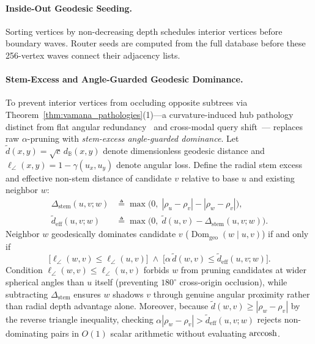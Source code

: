 \paragraph{Inside-Out Geodesic Seeding.}
Sorting vertices by non-decreasing depth schedules interior vertices before boundary waves. Router seeds are computed from the full database before these 256-vertex waves connect their adjacency lists.

\paragraph{Stem-Excess and Angle-Guarded Geodesic Dominance.}
To prevent interior vertices from occluding opposite subtrees via Theorem~\ref{thm:vamana_pathologies}(1)---a curvature-induced hub pathology distinct from flat angular redundancy~\cite{fu2019nsg,fu2022high} and cross-modal query shift~\cite{chen2024roargraph}---\rquiver{} replaces raw $\alpha$-pruning with \emph{stem-excess angle-guarded dominance}.
Let $\tilde{d}(x, y) = \sqrt{c}\,d_{\mathbb{B}}(x, y)$ denote dimensionless geodesic distance and $\ell_\angle(x, y) = 1 - \hat{\gamma}(u_x, u_y)$ denote angular loss.
Define the radial stem excess and effective non-stem distance of candidate $v$ relative to base $u$ and existing neighbor $w$:
\begin{align}
  \Delta_{\mathrm{stem}}(u, v; w) &\triangleq \max\!\bigl(0,\; |\rho_u - \rho_v| - |\rho_w - \rho_v|\bigr), \nonumber \\
  \tilde{d}_{\mathrm{eff}}(u, v; w) &\triangleq \max\!\bigl(0,\; \tilde{d}(u, v) - \Delta_{\mathrm{stem}}(u, v; w)\bigr).
  \label{eq:stem_excess}
\end{align}
Neighbor $w$ geodesically dominates candidate $v$ ($\operatorname{Dom}_{\mathrm{geo}}(w \mid u, v)$) if and only if
\begin{equation}
  \bigl[\ell_\angle(w, v) \le \ell_\angle(u, v)\bigr] \;\land\;
  \bigl[\alpha\,\tilde{d}(w, v) \le \tilde{d}_{\mathrm{eff}}(u, v; w)\bigr].
  \label{eq:dom_geo}
\end{equation}
Condition $\ell_\angle(w, v) \le \ell_\angle(u, v)$ forbids $w$ from pruning candidates at wider spherical angles than $u$ itself (preventing $180^\circ$ cross-origin occlusion), while subtracting $\Delta_{\mathrm{stem}}$ ensures $w$ shadows $v$ through genuine angular proximity rather than radial depth advantage alone.
Moreover, because $\tilde{d}(w, v) \ge |\rho_w - \rho_v|$ by the reverse triangle inequality, checking $\alpha|\rho_w - \rho_v| > \tilde{d}_{\mathrm{eff}}(u, v; w)$ rejects non-dominating pairs in $O(1)$ scalar arithmetic without evaluating $\operatorname{arccosh}$.

